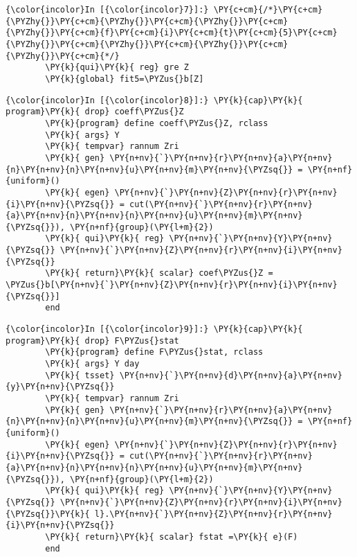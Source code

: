 \documentclass[11pt,notitlepage]{article}\usepackage[]{graphicx}\usepackage[]{color}
\makeatletter
\newenvironment{kframe}{%
 \def\at@end@of@kframe{}%
 \ifinner\ifhmode%
  \def\at@end@of@kframe{\end{minipage}}%
  \begin{minipage}{\columnwidth}%
 \fi\fi%
 \def\FrameCommand##1{\hskip\@totalleftmargin \hskip-\fboxsep
 \colorbox{shadecolor}{##1}\hskip-\fboxsep
     \hskip-\linewidth \hskip-\@totalleftmargin \hskip\columnwidth}%
 \MakeFramed {\advance\hsize-\width
   \@totalleftmargin\z@ \linewidth\hsize
   \@setminipage}}%
 {\par\unskip\endMakeFramed%
 \at@end@of@kframe}
\newenvironment{knitrout}{}{} %
\makeatother
\begin{document}
\begin{enumerate}[a)]
\begin{knitrout}
\begin{kframe}
    \begin{Verbatim}[commandchars=\\\{\}]
{\color{incolor}In [{\color{incolor}7}]:} \PY{c+cm}{/*}\PY{c+cm}{\PYZhy{}}\PY{c+cm}{\PYZhy{}}\PY{c+cm}{\PYZhy{}}\PY{c+cm}{\PYZhy{}}\PY{c+cm}{f}\PY{c+cm}{i}\PY{c+cm}{t}\PY{c+cm}{5}\PY{c+cm}{\PYZhy{}}\PY{c+cm}{\PYZhy{}}\PY{c+cm}{\PYZhy{}}\PY{c+cm}{\PYZhy{}}\PY{c+cm}{*/}
        \PY{k}{qui}\PY{k}{ reg} gre Z
        \PY{k}{global} fit5=\PYZus{}b[Z]
\end{Verbatim}

    \begin{Verbatim}[commandchars=\\\{\}]
{\color{incolor}In [{\color{incolor}8}]:} \PY{k}{cap}\PY{k}{ program}\PY{k}{ drop} coeff\PYZus{}Z
        \PY{k}{program} define coeff\PYZus{}Z, rclass
        \PY{k}{	args} Y
        \PY{k}{	tempvar} rannum Zri
        \PY{k}{	gen} \PY{n+nv}{`}\PY{n+nv}{r}\PY{n+nv}{a}\PY{n+nv}{n}\PY{n+nv}{n}\PY{n+nv}{u}\PY{n+nv}{m}\PY{n+nv}{\PYZsq{}} = \PY{n+nf}{uniform}()
        \PY{k}{	egen} \PY{n+nv}{`}\PY{n+nv}{Z}\PY{n+nv}{r}\PY{n+nv}{i}\PY{n+nv}{\PYZsq{}} = cut(\PY{n+nv}{`}\PY{n+nv}{r}\PY{n+nv}{a}\PY{n+nv}{n}\PY{n+nv}{n}\PY{n+nv}{u}\PY{n+nv}{m}\PY{n+nv}{\PYZsq{}}), \PY{n+nf}{group}(\PY{l+m}{2})
        \PY{k}{	qui}\PY{k}{ reg} \PY{n+nv}{`}\PY{n+nv}{Y}\PY{n+nv}{\PYZsq{}} \PY{n+nv}{`}\PY{n+nv}{Z}\PY{n+nv}{r}\PY{n+nv}{i}\PY{n+nv}{\PYZsq{}}
        \PY{k}{	return}\PY{k}{ scalar} coef\PYZus{}Z = \PYZus{}b[\PY{n+nv}{`}\PY{n+nv}{Z}\PY{n+nv}{r}\PY{n+nv}{i}\PY{n+nv}{\PYZsq{}}]
        end
\end{Verbatim}

    \begin{Verbatim}[commandchars=\\\{\}]
{\color{incolor}In [{\color{incolor}9}]:} \PY{k}{cap}\PY{k}{ program}\PY{k}{ drop} F\PYZus{}stat
        \PY{k}{program} define F\PYZus{}stat, rclass
        \PY{k}{	args} Y day
        \PY{k}{	tsset} \PY{n+nv}{`}\PY{n+nv}{d}\PY{n+nv}{a}\PY{n+nv}{y}\PY{n+nv}{\PYZsq{}}
        \PY{k}{	tempvar} rannum Zri
        \PY{k}{	gen} \PY{n+nv}{`}\PY{n+nv}{r}\PY{n+nv}{a}\PY{n+nv}{n}\PY{n+nv}{n}\PY{n+nv}{u}\PY{n+nv}{m}\PY{n+nv}{\PYZsq{}} = \PY{n+nf}{uniform}()
        \PY{k}{	egen} \PY{n+nv}{`}\PY{n+nv}{Z}\PY{n+nv}{r}\PY{n+nv}{i}\PY{n+nv}{\PYZsq{}} = cut(\PY{n+nv}{`}\PY{n+nv}{r}\PY{n+nv}{a}\PY{n+nv}{n}\PY{n+nv}{n}\PY{n+nv}{u}\PY{n+nv}{m}\PY{n+nv}{\PYZsq{}}), \PY{n+nf}{group}(\PY{l+m}{2})
        \PY{k}{	qui}\PY{k}{ reg} \PY{n+nv}{`}\PY{n+nv}{Y}\PY{n+nv}{\PYZsq{}} \PY{n+nv}{`}\PY{n+nv}{Z}\PY{n+nv}{r}\PY{n+nv}{i}\PY{n+nv}{\PYZsq{}}\PY{k}{ l}.\PY{n+nv}{`}\PY{n+nv}{Z}\PY{n+nv}{r}\PY{n+nv}{i}\PY{n+nv}{\PYZsq{}}
        \PY{k}{	return}\PY{k}{ scalar} fstat =\PY{k}{ e}(F)
        end
\end{Verbatim}


\end{kframe}
\end{knitrout}
\end{enumerate}
\end{document}
